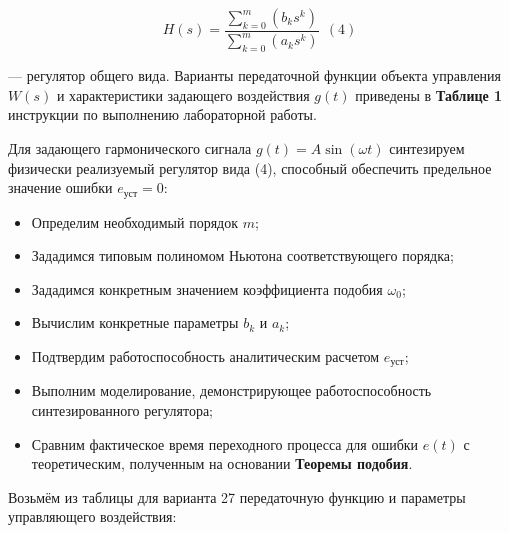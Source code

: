 \begin{par}
$$H(s)=\frac{\sum_{k=0}^m (b_k s^k )}{\sum_{k=0}^m (a_k s^k )}~~(4)$$
\end{par}


— регулятор общего вида. Варианты передаточной функции объекта управления $W(s)$ и характеристики задающего воздействия $g(t)$ приведены в \textbf{Таблице 1 }инструкции по выполнению лабораторной работы.


Для задающего гармонического сигнала $g(t)=A\sin (\omega t)$ синтезируем физически реализуемый регулятор вида (4), способный обеспечить предельное значение ошибки $e_{\text{уст}} =0$:

\begin{itemize}
\setlength{\itemsep}{-1ex}
   \item{\begin{flushleft} Определим необходимый порядок $m$; \end{flushleft}}
   \item{\begin{flushleft} Зададимся типовым полиномом Ньютона соответствующего порядка; \end{flushleft}}
   \item{\begin{flushleft} Зададимся конкретным значением коэффициента подобия $\omega_0$; \end{flushleft}}
   \item{\begin{flushleft} Вычислим конкретные параметры $b_k$ и $a_k$; \end{flushleft}}
   \item{\begin{flushleft} Подтвердим работоспособность аналитическим расчетом $e_{\text{уст}}$; \end{flushleft}}
   \item{\begin{flushleft} Выполним моделирование, демонстрирующее работоспособность синтезированного регулятора; \end{flushleft}}
   \item{\begin{flushleft} Сравним фактическое время переходного процесса для ошибки $e(t)$ с теоретическим, полученным на основании \textbf{Теоремы подобия}.     \end{flushleft}}
\end{itemize}


Возьмём из таблицы для варианта 27 передаточную функцию и параметры управляющего воздействия:

